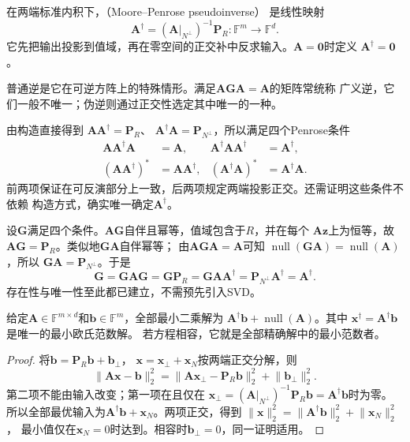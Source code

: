 \begin{definition}
\label{def:matrix-analysis-pseudoinverse}
在两端标准内积下，（Moore--Penrose pseudoinverse）
是线性映射
\[
 \bm A^\dagger=(\bm A|_{N^\perp})^{-1}\bm P_R:
 \mathbb F^m\longrightarrow\mathbb F^d.
\]
它先把输出投影到值域，再在零空间的正交补中反求输入。$\bm A=\bm0$时定义
$\bm A^\dagger=\bm0$。
\end{definition}
普通逆是它在可逆方阵上的特殊情形。满足$\bm A\bm G\bm A=\bm A$的矩阵常统称
广义逆，它们一般不唯一；伪逆则通过正交性选定其中唯一的一种。

由构造直接得到
$\bm A\bm A^\dagger=\bm P_R$、
$\bm A^\dagger\bm A=\bm P_{N^\perp}$，所以满足四个Penrose条件
\[
 \begin{aligned}
 \bm A\bm A^\dagger\bm A&=\bm A,&
 \bm A^\dagger\bm A\bm A^\dagger&=\bm A^\dagger,\\
 (\bm A\bm A^\dagger)^*&=\bm A\bm A^\dagger,&
 (\bm A^\dagger\bm A)^*&=\bm A^\dagger\bm A.
 \end{aligned}
\]
前两项保证在可反演部分上一致，后两项规定两端投影正交。还需证明这些条件不依赖
构造方式，确实唯一确定$\bm A^\dagger$。

设$\bm G$满足四个条件。$\bm A\bm G$自伴且幂等，值域包含于$R$，并在每个
$\bm A\bm z$上为恒等，故$\bm A\bm G=\bm P_R$。类似地$\bm G\bm A$自伴幂等；
由$\bm A\bm G\bm A=\bm A$可知
$\operatorname{null}(\bm G\bm A)=\operatorname{null}(\bm A)$，所以
$\bm G\bm A=\bm P_{N^\perp}$。于是
\[
 \bm G=\bm G\bm A\bm G
 =\bm G\bm P_R
 =\bm G\bm A\bm A^\dagger
 =\bm P_{N^\perp}\bm A^\dagger
 =\bm A^\dagger.
\]
存在性与唯一性至此都已建立，不需预先引入SVD。

\begin{theorem}[最小二乘与最小范数]
\label{thm:matrix-analysis-pseudoinverse-minimum-norm}
给定$\bm A\in\mathbb F^{m\times d}$和$\bm b\in\mathbb F^m$，全部最小二乘解为
$\bm A^\dagger\bm b+\operatorname{null}(\bm A)$。其中
$\bm x^\dagger=\bm A^\dagger\bm b$是唯一的最小欧氏范数解。
若方程相容，它就是全部精确解中的最小范数者。
\end{theorem}
\begin{proof}
将$\bm b=\bm P_R\bm b+\bm b_\perp$，
$\bm x=\bm x_\perp+\bm x_N$按两端正交分解，则
\[
 \lVert\bm A\bm x-\bm b\rVert_2^2
 =\lVert\bm A\bm x_\perp-\bm P_R\bm b\rVert_2^2
  +\lVert\bm b_\perp\rVert_2^2.
\]
第二项不能由输入改变；第一项在且仅在
$\bm x_\perp=(\bm A|_{N^\perp})^{-1}\bm P_R\bm b=\bm A^\dagger\bm b$时为零。
所以全部最优输入为$\bm A^\dagger\bm b+\bm x_N$。两项正交，得到
$\lVert\bm x\rVert_2^2=\lVert\bm A^\dagger\bm b\rVert_2^2+\lVert\bm x_N\rVert_2^2$，
最小值仅在$\bm x_N=0$时达到。相容时$\bm b_\perp=0$，同一证明适用。
\end{proof}


